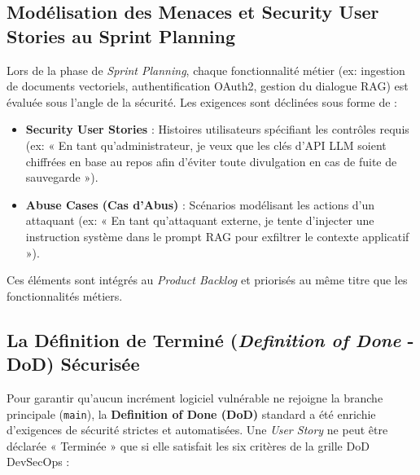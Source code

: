 \subsection{Modélisation des Menaces et Security User Stories au Sprint Planning}

Lors de la phase de \textit{Sprint Planning}, chaque fonctionnalité métier (ex: ingestion de documents vectoriels, authentification OAuth2, gestion du dialogue RAG) est évaluée sous l'angle de la sécurité. Les exigences sont déclinées sous forme de :
\begin{itemize}
    \item \textbf{Security User Stories} : Histoires utilisateurs spécifiant les contrôles requis (ex: « En tant qu'administrateur, je veux que les clés d'API LLM soient chiffrées en base au repos afin d'éviter toute divulgation en cas de fuite de sauvegarde »).
    \item \textbf{Abuse Cases (Cas d'Abus)} : Scénarios modélisant les actions d'un attaquant (ex: « En tant qu'attaquant externe, je tente d'injecter une instruction système dans le prompt RAG pour exfiltrer le contexte applicatif »).
\end{itemize}

Ces éléments sont intégrés au \textit{Product Backlog} et priorisés au même titre que les fonctionnalités métiers.

\subsection{La Définition de Terminé (\textit{Definition of Done} - DoD) Sécurisée}

Pour garantir qu'aucun incrément logiciel vulnérable ne rejoigne la branche principale (\texttt{main}), la \textbf{Definition of Done (DoD)} standard a été enrichie d'exigences de sécurité strictes et automatisées. Une \textit{User Story} ne peut être déclarée « Terminée » que si elle satisfait les six critères de la grille DoD DevSecOps :

